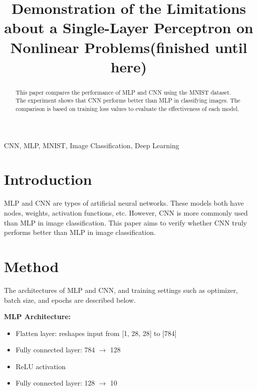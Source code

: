 \documentclass[conference]{IEEEtran}
\begin{document}
\title{Demonstration of the Limitations about a Single-Layer Perceptron on Nonlinear Problems(finished until here)}

\author{
}

\maketitle

\begin{abstract}
This paper compares the performance of MLP and CNN using the MNIST dataset. The experiment shows that CNN performs better than MLP in classifying images. The comparison is based on training loss values to evaluate the effectiveness of each model.

\end{abstract}

\begin{IEEEkeywords}
CNN, MLP, MNIST, Image Classification, Deep Learning
\end{IEEEkeywords}

\section{Introduction}
MLP and CNN are types of artificial neural networks. These models both have nodes, weights, activation functions, etc. However, CNN is more commonly used than MLP in image classification. This paper aims to verify whether CNN truly performs better than MLP in image classification.

\section{Method}
The architectures of MLP and CNN, and training settings such as optimizer, batch size, and epochs are described below.

\textbf{MLP Architecture:}
\begin{itemize}
  \item Flatten layer: reshapes input from [1, 28, 28] to [784]
  \item Fully connected layer: 784 $\rightarrow$ 128
  \item ReLU activation
  \item Fully connected layer: 128 $\rightarrow$ 10
\end{itemize}
\end{document}
